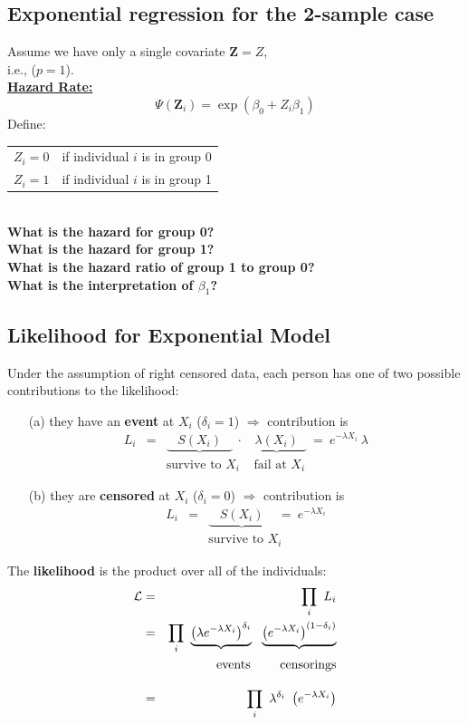 \documentclass[11pt,psfig]{book}
\newcommand{\bfZ}{\mathbf{Z}}
\begin{document}
\subsection{Exponential regression for the 2-sample case}
Assume we have only a single covariate $\bfZ=Z$,\\
i.e., ($p=1$).\\[2ex]
\underline{\bf Hazard Rate:}
\[\Psi(\bfZ_i) = \exp( \beta_0 + Z_i \beta_1 ) \]
Define:~~~~
\begin{tabular}{ll}
$Z_{i}= 0$  & if individual $i$ is in group 0\\
$Z_{i}= 1$  & if individual $i$ is in group 1\\
\end{tabular}
\\[2ex]
{\bf What is the hazard for group 0?}
\\[2ex]
{\bf What is the hazard for group 1?}
\\[2ex]
{\bf What is the hazard ratio of group 1 to group 0?}
\\[2ex]
{\bf What is the interpretation of $\beta_1$?}
\subsection{Likelihood for Exponential Model}
Under the assumption of right censored data, each person has one of
two possible contributions to the likelihood:
\begin{itemize}
\item[(a)] they have an {\bf event} at $X_i$ ($\delta_i=1$) $\Rightarrow$
contribution is
\begin{eqnarray*}
L_i & = & \underbrace{~~~~S(X_i)~~~~}
~ \cdot ~ \underbrace{~~~\lambda(X_i)~~~}
~=~ e^{-\lambda X_i} ~ \lambda\\[1ex]
    &   & \mbox{survive to $X_i$} ~~~~~ \mbox{fail at $X_i$}
\end{eqnarray*}

\item[(b)] they are {\bf censored} at $X_i$ ($\delta_i=0$) $\Rightarrow$
contribution is
\begin{eqnarray*}
L_i & = & \underbrace{~~~~S(X_i)~~~~} ~=~ e^{-\lambda X_i}\\[1ex]
    &   & \mbox{survive to $X_i$}
\end{eqnarray*}
\end{itemize}
The {\bf likelihood} is the product over all of the individuals:
\begin{eqnarray*}
{\cal L} & = & \prod_i ~ L_i \\
& = & \prod_i ~\underbrace{\left(\lambda e^{-\lambda X_i}\right)^{\delta_i}}
  ~~ \underbrace{\left(e^{-\lambda X_i}\right)^{(1-\delta_i)}}\\
& & ~~~~~~~~\mbox{events} ~~~~~~~ \mbox{censorings}\\[2ex]
         & = & \prod_i ~\lambda^{\delta_i} ~\left(e^{-\lambda X_i}\right)
\end{eqnarray*}
\end{document}

